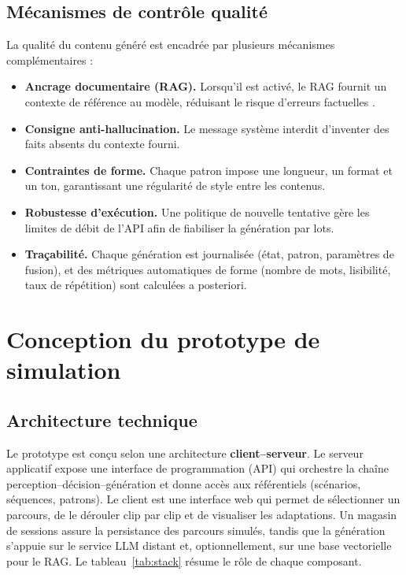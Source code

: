 \subsection{Mécanismes de contrôle qualité}

La qualité du contenu généré est encadrée par plusieurs mécanismes complémentaires :

\begin{itemize}[leftmargin=1.4em]
  \item \textbf{Ancrage documentaire (RAG).} Lorsqu'il est activé, le RAG fournit
  un contexte de référence au modèle, réduisant le risque d'erreurs factuelles
  \cite{lewis2020retrieval}.
  \item \textbf{Consigne anti-hallucination.} Le message système interdit
  d'inventer des faits absents du contexte fourni.
  \item \textbf{Contraintes de forme.} Chaque patron impose une longueur, un
  format et un ton, garantissant une régularité de style entre les contenus.
  \item \textbf{Robustesse d'exécution.} Une politique de nouvelle tentative gère
  les limites de débit de l'API afin de fiabiliser la génération par lots.
  \item \textbf{Traçabilité.} Chaque génération est journalisée (état, patron,
  paramètres de fusion), et des métriques automatiques de forme (nombre de mots,
  lisibilité, taux de répétition) sont calculées a posteriori.
\end{itemize}

\section{Conception du prototype de simulation}
\label{sec:prototype}

\subsection{Architecture technique}

Le prototype est conçu selon une architecture \textbf{client–serveur}. Le serveur
applicatif expose une interface de programmation (API) qui orchestre la chaîne
perception–décision–génération et donne accès aux référentiels (scénarios,
séquences, patrons). Le client est une interface web qui permet de sélectionner un
parcours, de le dérouler clip par clip et de visualiser les adaptations. Un
magasin de sessions assure la persistance des parcours simulés, tandis que la
génération s'appuie sur le service LLM distant et, optionnellement, sur une base
vectorielle pour le RAG. Le tableau~\ref{tab:stack} résume le rôle de chaque
composant.

